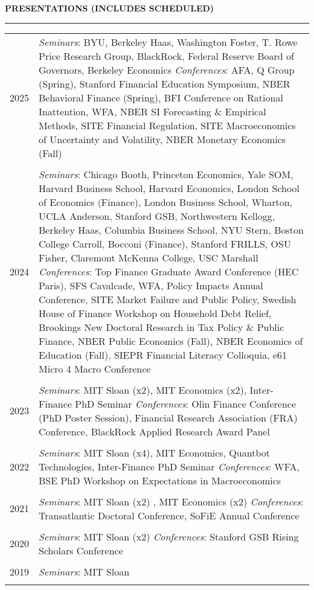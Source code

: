 \documentclass[a4paper, 10pt]{article}
\newcommand{\cvsec}[1]
{
	\needspace{2\baselineskip}
	\noindent \textbf{#1}
	
	\vspace{2pt}
	
	\hrule
	
	\bigskip
}
\newcommand{\cvitem}[2]{#1 & #2 \\ & \\}
\newenvironment{cvchrono}[1]
{
	\cvsec{#1}
	\begin{tabu} to \linewidth {X[1,l]X[6,l]} 
}
{
	\end{tabu}
}
\begin{document}
\begin{cvchrono}{PRESENTATIONS (INCLUDES SCHEDULED)}
	\cvitem{2025}{\textit{Seminars}: BYU, Berkeley Haas, Washington Foster, T. Rowe Price Research Group, BlackRock, Federal Reserve Board of Governors, Berkeley Economics  \newline \textit{Conferences}: AFA, Q Group (Spring), Stanford Financial Education Symposium, NBER Behavioral Finance (Spring), BFI Conference on Rational Inattention, WFA, NBER SI Forecasting \& Empirical Methods, SITE Financial Regulation, SITE Macroeconomics of Uncertainty and Volatility, NBER Monetary Economics (Fall)}
	\cvitem{2024}{\textit{Seminars}: Chicago Booth, Princeton Economics, Yale SOM, Harvard Business School, Harvard Economics, London School of Economics (Finance), London Business School, Wharton, UCLA Anderson, Stanford GSB, Northwestern Kellogg, Berkeley Haas, Columbia Business School, NYU Stern, Boston College Carroll, Bocconi (Finance), Stanford FRILLS, OSU Fisher, Claremont McKenna College, USC Marshall \newline \textit{Conferences}: Top Finance Graduate Award Conference (HEC Paris), SFS Cavalcade, WFA, Policy Impacts Annual Conference, SITE Market Failure and Public Policy, Swedish House of Finance Workshop on Household Debt Relief, Brookings New Doctoral Research in Tax Policy \& Public Finance, NBER Public Economics (Fall), NBER Economics of Education (Fall), SIEPR Financial Literacy Colloquia, e61 Micro 4 Macro Conference}
	\cvitem{2023}{\textit{Seminars}: MIT Sloan (x2), MIT Economics (x2), Inter-Finance PhD Seminar \newline \textit{Conferences}: Olin Finance Conference (PhD Poster Session), Financial Research Association (FRA) Conference, BlackRock Applied Research Award Panel}
	\cvitem{2022}{\textit{Seminars}: MIT Sloan (x4), MIT Economics, Quantbot Technologies, Inter-Finance PhD Seminar \newline \textit{Conferences}: WFA, BSE PhD Workshop on Expectations in Macroeconomics}
	\cvitem{2021}{\textit{Seminars}: MIT Sloan (x2) , MIT Economics (x2) \newline \textit{Conferences}: Transatlantic Doctoral Conference, SoFiE Annual Conference}
	\cvitem{2020}{\textit{Seminars}: MIT Sloan (x2) \newline \textit{Conferences}: Stanford GSB Rising Scholars Conference}
	\cvitem{2019}{\textit{Seminars}: MIT Sloan}
\end{cvchrono}

\end{document}
